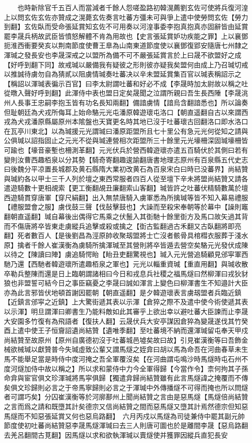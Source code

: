 　　也時新除官千五百人而當減者千餘人怨嗟盈路初韓滉薦劉玄佐可使將兵復河湟上以問玄佐玄佐亦贊成之滉薨玄佐奏言吐蕃方彊未可與爭上遣中使勞問玄佐【勞力到翻】玄佐臥而受命張延賞知玄佐不可用奏以河湟事委李抱真抱真亦固辭皆由延賞罷李晟兵柄故武臣皆憤怒解體不肯為用故也【史言張延賞妒功疾能之罪】上以襄鄧扼淮西衝要癸亥以荆南節度使曹王臯為山南東道節度使以襄鄧復郢安隨唐七州隸之　渾瑊之發長安也李晟深戒之以盟所為備不可不嚴張延賞言於上曰晟不欲盟好之成【好呼到翻下同】故戒瑊以嚴備我有疑彼之形則彼亦疑我矣盟何由成上乃召瑊切戒以推誠待虜勿自為猜貳以阻虜情瑊奏吐蕃决以辛未盟延賞集百官以瑊表稱詔示之【稱詔以渾瑊表徧示百官】曰李太尉謂吐蕃和好必不成【李晟時加太尉故以稱之吐從暾入聲好呼到翻】此渾侍中表也盟日定矣晟聞之泣謂所親曰吾生長西陲【李晟洮州人長事王忠嗣李抱玉皆有功名長知兩翻】備諳虜情【諳烏含翻諳悉也】所以論奏但耻朝廷為犬戎所侮耳上始命駱元光屯潘原韓遊瓌屯洛口【朝直遥翻自古以來謂西戎為犬戎潘原縣屬原州本隂盤也天寶更名時其地已沒于吐蕃瓌古回翻洛口即水洛口在瓦亭川東北】以為瑊援元光謂瑊曰潘原距盟所且七十里公有急元光何從知之請與公俱瑊以詔指固止之元光不從與瑊連營相次距盟所三十餘里元光壕柵深固瑊壕柵皆可踰也【壕音豪塹也柵測革翻】元光伏兵於營西韓遊瓌亦遣五百騎伏於其側曰若有變則汝曹西趣栢泉以分其勢【騎奇寄翻趣逡諭翻唐書地理志原州有百泉縣五代史志曰後魏分平凉置長城郡及黄石縣隋大業初改黄石為百泉宋白曰時已没蕃界】尚結贊與瑊約各以甲士三千人列於壇之東西常服者四百人從至壇下辛未將盟尚結贊又請各遣遊騎數十更相覘索【更工衡翻覘丑廉翻索山客翻】瑊皆許之吐蕃伏精騎數萬於壇西遊騎貫穿唐軍【穿尺絹翻】出入無禁唐騎入虜軍悉為所擒瑊等皆不知入幕易禮服【禮服盟會之服】虜伐鼓三聲【伐鼔擊鼓也】大譟而至殺宋奉朝等於幕中【譟則竈翻朝直遥翻】瑊自幕後出偶得它馬乘之伏鬛入其衘馳十餘里衘方及馬口故矢過其背而不傷唐將卒皆東走虜縱兵追擊或殺或擒之【衘古監翻過古禾翻又古臥翻將即亮翻】死者數百人【是後劉昌為涇原帥收聚刼盟將士亡沒者骸骨具棺槥衣服葬于淺水原】擒者千餘人崔漢衡為虜騎所擒渾瑊至其營則將卒皆遁去營空矣駱元光發伏成陳以待之【陳讀曰陣】虜追騎愕眙【眙丑吏翻驚視也】瑊入元光營追騎顧見邠寜軍西馳乃還【西馳者韓遊瓌所遣趣栢泉之軍也】元光以輜重資瑊【重直用翻】與瑊收散卒勒兵整陳而還是日上臨朝謂諸相曰今日和戎息兵社稷之福馬燧曰然柳渾曰戎狄豺狼也非盟誓可結今日之事臣竊憂之李晟曰誠如渾言上變色曰柳渾書生不知邉計大臣亦為此言邪皆伏地頓首謝因罷朝【朝直遥翻】是夕韓遊瓌表言虜刼盟者兵臨近鎮【近鎮言邠寜之近鎮】上大驚街遞其表以示渾【倉猝之際不及遣中使今術使遞其表以示渾】明旦謂渾曰卿書生乃能料敵如此其審乎上欲出幸以避吐蕃大臣諫而止李晟大安園多竹復有為飛語者【復扶人翻】云晟伏兵大安亭謀因倉猝為變晟遂伐其竹癸酉上遣中使王子恒齎詔遺尚結贊【遺唯季翻】至吐蕃境不納而還渾瑊留屯奉天甲戍尚結贊至故原州【原州自廣德初沒于吐蕃城邑墟矣故曰故】引見崔漢衡等曰吾飾金械欲械瑊以獻贊普今失瑊虛致公輩又謂馬燧之姪弇曰胡以馬為命吾在河曲春草未生馬不能舉足當是時侍中度河掩之吾全軍覆沒矣【在河曲謂屯鳴沙時馬燧時屯石州不度河燧加侍中故以稱之】所以求和蒙侍中力今全軍得歸【今當作令】柰何拘其子孫命弇與宦官俱文珍渾瑊將馬寜俱歸【獨遣弇歸尚結贊雖有此言馬燧諱之掩覆而不傳矣俱文珍歸則必言之于帝馬寧歸則必言之于渾瑊中外傳播燧不可得而掩也所以問燧者可謂巧矣】分囚崔漢衡等於河廓鄯州上聞尚結贊之言由是惡馬燧【馬燧倍尚結贊之言而爲之請和既墮其計矣德宗又信尚結贊之間而惡馬燧又墮其計焉然德宗但知惡馬燧而不知惡張延賞又何也惡烏路翻】　六月丙戍以馬燧為司徒兼侍中罷其副元帥節度使初吐蕃尚結贊惡李晟馬燧渾瑊曰去三人則唐可圖也於是離間李晟【惡烏路翻去羌呂翻間古莧翻】因馬燧以求和欲執渾瑊以賣燧使并獲罪因縱兵直犯長安